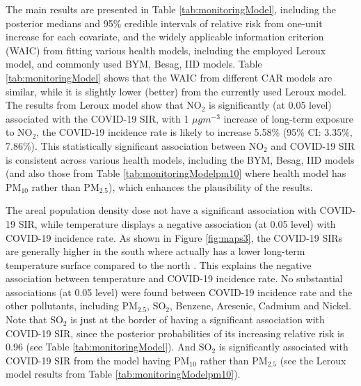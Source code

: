 \documentclass[12,]{article}
\begin{document}
The main results are presented in Table \ref{tab:monitoringModel},
including the posterior medians and 95\% credible intervals of relative
risk from one-unit increase for each covariate, and the widely
applicable information criterion (WAIC) \autocite{Watanabe2010} from
fitting various health models, including the employed Leroux model, and
commonly used BYM, Besag, IID models. Table \ref{tab:monitoringModel}
shows that the WAIC from different CAR models are similar, while it is
slightly lower (better) from the currently used Leroux model. The
results from Leroux model show that NO\(_2\) is significantly (at 0.05
level) associated with the COVID-19 SIR, with 1 \(\mu gm^{-3}\) increase
of long-term exposure to NO\(_2\), the COVID-19 incidence rate is likely
to increase 5.58\% (95\% CI: 3.35\%, 7.86\%). This statistically
significant association between NO\(_2\) and COVID-19 SIR is consistent
across various health models, including the BYM, Besag, IID models (and
also those from Table \ref{tab:monitoringModelpm10} where health model
has PM\(_{10}\) rather than PM\(_{2.5}\)), which enhances the
plausibility of the results.

The areal population density dose not have a significant association
with COVID-19 SIR, while temperature displays a negative association (at
0.05 level) with COVID-19 incidence rate. As shown in Figure
\ref{fig:maps3}, the COVID-19 SIRs are generally higher in the south
where actually has a lower long-term temperature surface compared to the
north \autocite[see][]{mapsofworld2020}. This explains the negative
association between temperature and COVID-19 incidence rate. No
substantial associations (at 0.05 level) were found between COVID-19
incidence rate and the other pollutants, including PM\(_{2.5}\),
SO\(_2\), Benzene, Aresenic, Cadmium and Nickel. Note that SO\(_2\) is
just at the border of having a significant association with COVID-19
SIR, since the posterior probabilities of its increasing relative risk
is 0.96 (see Table \ref{tab:monitoringModel}). And SO\(_2\) is
significantly associated with COVID-19 SIR from the model having
PM\(_{10}\) rather than PM\(_{2.5}\) (see the Leroux model results from
Table \ref{tab:monitoringModelpm10}).

\end{document}
